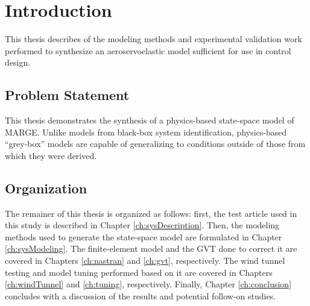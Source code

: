 \chapter{Introduction}
\label{ch:introduction}

This thesis describes of the modeling methods and experimental validation work performed to synthesize an aeroservoelastic model sufficient for use in control design.

%
%
%
%
%
%

\section{Problem Statement} %

This thesis demonstrates the synthesis of a physics-based state-space model of MARGE. Unlike models from black-box system identification, physics-based ``grey-box'' models are capable of generalizing to conditions outside of those from which they were derived.

%
%

\section{Organization} %

The remainer of this thesis is organized as follows: first, the test article used in this study is described in Chapter \ref{ch:sysDescription}. Then, the modeling methods used to generate the state-space model are formulated in Chapter \ref{ch:sysModeling}. The finite-element model and the GVT done to correct it are covered in Chapters \ref{ch:nastran} and \ref{ch:gvt}, respectively. The wind tunnel testing and model tuning performed based on it are covered in Chapters \ref{ch:windTunnel} and \ref{ch:tuning}, respectively. Finally, Chapter \ref{ch:conclusion} concludes with a discussion of the results and potential follow-on studies.